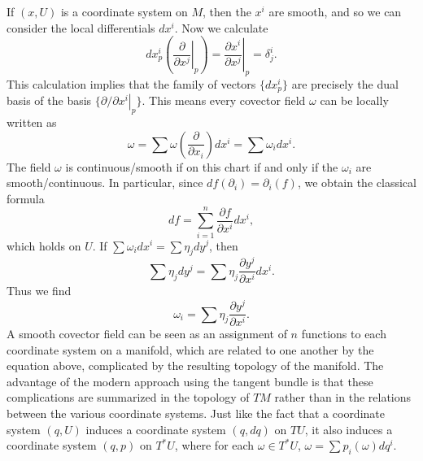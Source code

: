 If $(x,U)$ is a coordinate system on $M$, then the $x^i$ are smooth, and so we can consider the local differentials $dx^i$. Now we calculate
%
\[ dx^i_p \left( \left. \frac{\partial}{\partial x^j} \right|_p \right) = \left. \frac{\partial x^i}{\partial x^j} \right|_p = \delta^i_j. \]
%
This calculation implies that the family of vectors $\{ dx^i_p \}$ are precisely the dual basis of the basis $\{ \left. \partial/\partial x^i\right|_p \}$. This means every covector field $\omega$ can be locally written as
%
\[ \omega = \sum \omega \left( \frac{\partial}{\partial x_i} \right) dx^i = \sum \omega_i dx^i. \]
%
The field $\omega$ is continuous/smooth if on this chart if and only if the $\omega_i$ are smooth/continuous. In particular, since $df(\partial_i) = \partial_i(f)$, we obtain the classical formula
%
\[ df = \sum_{i = 1}^n \frac{\partial f}{\partial x^i} dx^i, \]
%
which holds on $U$. If $\sum \omega_i dx^i = \sum \eta_j dy^j$, then
%
\[ \sum \eta_j dy^j = \sum \eta_j \frac{\partial y^j}{\partial x^i} dx^i. \]
%
Thus we find
%
\[ \omega_i = \sum \eta_j \frac{\partial y^j}{\partial x^i}. \]
%
A smooth covector field can be seen as an assignment of $n$ functions to each coordinate system on a manifold, which are related to one another by the equation above, complicated by the resulting topology of the manifold. The advantage of the modern approach using the tangent bundle is that these complications are summarized in the topology of $TM$ rather than in the relations between the various coordinate systems. Just like the fact that a coordinate system $(q,U)$ induces a coordinate system $(q,dq)$ on $TU$, it also induces a coordinate system $(q,p)$ on $T^*U$, where for each $\omega \in T^*U$, $\omega = \sum p_i(\omega) dq^i$.

